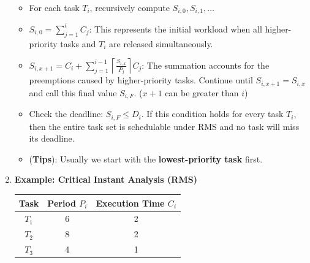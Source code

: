 \documentclass[10pt, landscape]{article}
\begin{document}
\begin{multicols}{4}
\begin{enumerate}
\begin{itemize}
        \item For each task $T_i$, recursively compute $S_{i,0}, S_{i,1}, \ldots$
        \item $S_{i,0} = \sum_{j=1}^{i} C_j$: This represents the initial workload when all higher-priority tasks and $T_i$ are released simultaneously.
        \item $S_{i,x+1} = C_i + \sum_{j=1}^{i-1} \left\lceil \frac{S_{i,x}}{P_j} \right\rceil C_j$: The summation accounts for the preemptions caused by higher-priority tasks. Continue until $S_{i,x+1} = S_{i,x}$ and call this final value $S_{i,F}$. ($x+1$ can be greater than $i$)
        \item Check the deadline: $S_{i,F} \le D_i$. If this condition holds for every task $T_i$, then the entire task set is schedulable under RMS and no task will miss its deadline.
        \item (\textbf{Tips}): Usually we start with the \textbf{lowest-priority task} first.
    \end{itemize}
    \item \textbf{Example: Critical Instant Analysis (RMS)}
    \begin{tabular}{c|cc}
    \hline
    \textbf{Task} & \textbf{Period }$P_i$ & \textbf{Execution Time }$C_i$ \\
    \hline
    $T_1$ & 6 & 2 \\
    $T_2$ & 8 & 2 \\
    $T_3$ & 4 & 1 \\
    \hline
    \end{tabular}
    

\end{enumerate}
\end{multicols}
\end{document}
